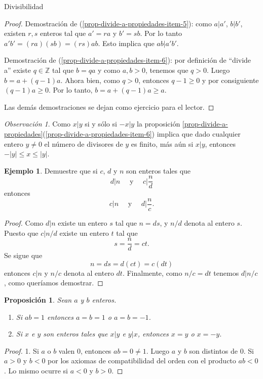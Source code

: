\documentclass[11pt,spanish,makeidx]{amsbook}
\newtheorem{proposicion}[teorema]{Proposici\'on}
\theoremstyle{definition}
\newtheorem{ejemplo}{Ejemplo}[section]
\theoremstyle{remark}
\newtheorem{observacion}{Observaci\'on}[section]
\newcommand \ZZ{{\mathbb Z}}
\begin{document}
\begin{section}{Divisibilidad}
\begin{proof}
	Demostración de (\ref{prop-divide-a-propiedades-item-5}): como $a|a'$, $b|b'$, existen $r,s$ enteros tal que $a'=ra$ y $b' =sb$. Por lo tanto $a'b' = (ra)(sb) = (rs)ab$. Esto implica que  $ab|a'b'$.
	
	Demostración de (\ref{prop-divide-a-propiedades-item-6}): por definición de ``divide a'' existe $q \in \ZZ$ tal que $b = qa$ y como $a,b>0$,  tenemos que $q>0$. Luego $b = a + (q-1)a$. Ahora bien,  como $q >0$,  entonces $q-1 \ge0$ y por consiguiente $(q-1)a \ge 0$. Por lo tanto,  $b = a + (q-1)a \ge a$.

	Las demás demostraciones se dejan como ejercicio para el lector. 

\end{proof}



\begin{observacion}
	Como $x|y$ si y sólo si $-x|y$ la proposición  \ref{prop-divide-a-propiedades}(\ref{prop-divide-a-propiedades-item-6}) implica que dado cualquier entero $y \ne 0$ el número de divisores de  $y$ es finito,  más aún si $x|y$,  entonces $-|y| \le x \le |y|$.  
\end{observacion}



\begin{ejemplo} Demuestre que si $c$, $d$ y $n$ son enteros tales
que
$$
d|n \quad\text{ y }\quad c|\frac{n}{d}
$$
entonces
$$
c|n \quad\text{ y }\quad d|\frac{n}{c}.
$$
\end{ejemplo}
\begin{proof} Como $d|n$ existe un entero $s$ tal que $n=ds$, y $n/d$ denota al entero $s$. Puesto que $c|n/d$ existe un entero $t$ tal que
$$
s=\frac{n}{d} =ct.
$$
Se sigue que
$$
n=ds=d(ct)=c(dt)
$$
entonces $c|n$ y $n/c$ denota al entero $dt$. Finalmente, como $n/c=dt$ tenemos $d|n/c$, como queríamos demostrar.
\end{proof}


\begin{proposicion}\label{pm} Sean $a$ y $b$ enteros.
\begin{enumerate}
\item Si  $ab=1$ entonces $a=b=1$ o $a=b=-1$. 
\item Si $x$ e $y$ son enteros tales que $x|y$ e $y|x$, entonces $x=y$ o $x=-y$.
\end{enumerate}
\end{proposicion}
\begin{proof} 1. Si $a$ o $b$ valen 0, entonces $ab=0 \not=1$. Luego $a$ y $b$ son distintos de 0. Si $a>0$ y $b<0$ por los axiomas de compatibilidad del orden con el producto $ab<0$. Lo mismo ocurre si $a<0$ y $b>0$.


\end{proof}
\end{section}
\end{document}
